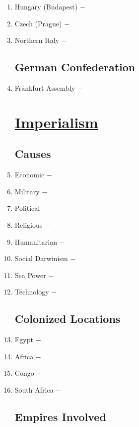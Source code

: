 \documentclass[12pt]{article}
\begin{document}
\begin{enumerate}
\item Hungary (Budapest) $-$ 

\item Czech (Prague) $-$ 

\item Northern Italy $-$ 

\subsection{German Confederation}


\item Frankfurt Assembly $-$ 

\section{\underline{Imperialism}}

\subsection{Causes}

\item Economic $-$ 

\item Military $-$ 

\item Political $-$ 

\item Religious $-$ 

\item Humanitarian $-$ 

\item Social Darwinism $-$ 

\item Sea Power $-$ 

\item Technology $-$ 

\subsection{Colonized Locations}

\item Egypt $-$

\item Africa $-$ 

\item Congo $-$ 

\item South Africa $-$ 

\subsection{Empires Involved}


\end{enumerate}
\end{document}
